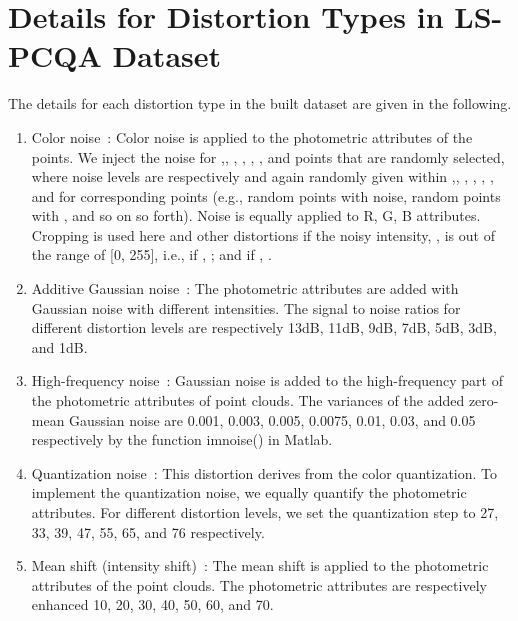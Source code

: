 \documentclass[acmsmall]{acmart}
\begin{document}



\appendix

\section{Details for Distortion Types in LS-PCQA Dataset}\label{sec:distortiondetails}

\par The details for each distortion type in the built dataset are given in the following.

\begin{enumerate}
\item {\sf Color noise~\cite{Ponomarenko2015TID2013,Yang2020TMM3DTO2D}}: Color noise is applied to the photometric attributes of the points. We inject the noise for  ,, , , , , and  points that are randomly selected, where noise levels are respectively and again randomly given within  ,, , , , , and  for corresponding points (e.g.,  random points with  noise,   random points with , and so on so forth). Noise is equally applied to R, G, B attributes. Cropping is used here and other distortions if the noisy intensity, , is out of the range of [0, 255], i.e., if , ; and if , .
  \item {\sf Additive Gaussian noise~\cite{Boyat2015ImageNoise,Ponomarenko2015TID2013,Yang2020TMM3DTO2D}}: The photometric attributes are added with Gaussian noise with different intensities. The signal to noise ratios for different distortion levels are respectively 13dB, 11dB, 9dB, 7dB, 5dB, 3dB, and 1dB.
  \item {\sf High-frequency noise~\cite{Ponomarenko2015TID2013}}: Gaussian noise is added to the high-frequency part of the photometric attributes of point clouds. The variances of the added zero-mean Gaussian noise are 0.001, 0.003, 0.005, 0.0075, 0.01, 0.03, and 0.05 respectively by the function imnoise() in Matlab.
  \item {\sf Quantization noise~\cite{Boyat2015ImageNoise,Ponomarenko2015TID2013}}: This distortion derives from the color quantization. To implement the quantization noise, we equally quantify the photometric attributes. For different distortion levels, we set the quantization step to 27, 33, 39, 47, 55, 65, and 76 respectively.
  \item {\sf Mean shift (intensity shift)~\cite{Ponomarenko2015TID2013}}: The mean shift is applied to the photometric attributes of the point clouds. The photometric attributes are respectively enhanced 10, 20, 30, 40, 50, 60, and 70.

\end{enumerate}
\end{document}

